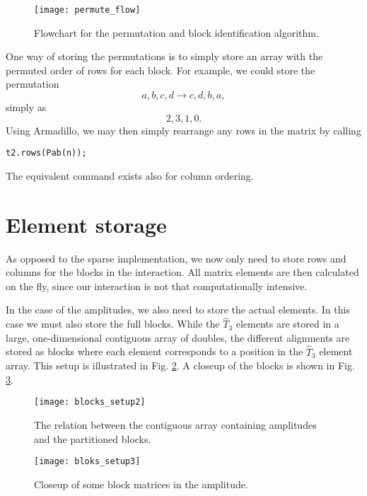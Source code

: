 \begin{figure}[hbtp]
    \centering
    \texttt{[image: permute\_flow]}
    \caption{Flowchart for the permutation and block identification algorithm.}
    \label{fig:permute_flow}
\end{figure}

One way of storing the permutations is to simply store an array with
the permuted order of rows for each block. For example, we could store
the permutation
\begin{equation}
a, b, c, d \rightarrow c, d, b, a,
\end{equation}
simply as 
\begin{equation}
2, 3, 1, 0.
\end{equation}
Using Armadillo, we may then simply rearrange any rows in the matrix by calling
\begin{verbatim}
t2.rows(Pab(n));
\end{verbatim}





The equivalent command exists also for column ordering. 

\section{Element storage}

As opposed to the sparse implementation, we now only need to store rows and columns for the blocks in the interaction. All matrix elements are then calculated on the fly, since our interaction is not that computationally intensive.

In the case of the amplitudes, we also need to store the actual elements. In this case we must also store the full blocks. While the $\hat{T}_3$ elements are stored in a large, one-dimensional contiguous array of doubles, the different alignments are stored as blocks where each element corresponds to a position in the $\hat{T}_3$ element array. This setup is illustrated in Fig. \ref{fig2}. A closeup of the blocks is shown in Fig. \ref{fig:blocks_setup3}. 

\begin{figure}[hbtp]
    \centering
    \texttt{[image: blocks\_setup2]}
    \caption{The relation between the contiguous array containing amplitudes and the partitioned blocks.}
    \label{fig2}
\end{figure}

\begin{figure}[hbtp]
    \centering
    \texttt{[image: bloks\_setup3]}
    \caption{Closeup of some block matrices in the amplitude.}
    \label{fig:blocks_setup3}
\end{figure}



